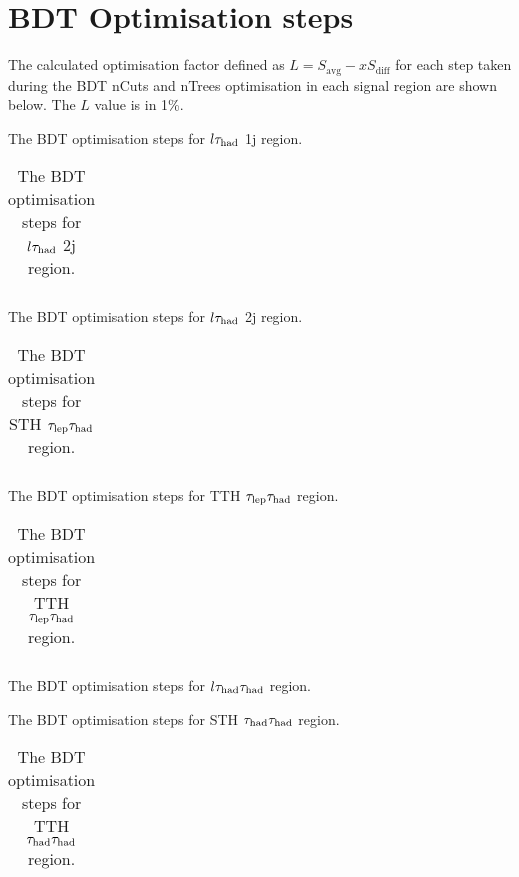 \section{BDT Optimisation steps}
\label{sec:BDTOptim}

The calculated optimisation factor defined as $L=S_\mathrm{avg}-xS_\mathrm{diff}$ for each step taken during the BDT nCuts and nTrees optimisation in each signal region are shown below. The $L$ value is in 1\%.

\begin{table}[H]
\caption{The BDT optimisation steps for $l\tau_\text{had}$ 1j region.}

\end{table}
\begin{longtable}{|c|c|c|c|c|c|}
\caption{The BDT optimisation steps for $l\tau_\text{had}$ 2j region.}\\\hline

\end{longtable}
\begin{table}[H]
\caption{The BDT optimisation steps for $l\tau_\text{had}$ 2j region.}

\end{table}
\begin{longtable}{|c|c|c|c|c|c|}
\caption{The BDT optimisation steps for STH $\tau_\text{lep}{}\tau_\text{had}$ region.}\\\hline

\end{longtable}
\begin{table}[H]
\caption{The BDT optimisation steps for TTH $\tau_\text{lep}{}\tau_\text{had}$ region.}

\end{table}
\begin{longtable}{|c|c|c|c|c|c|c|}
\caption{The BDT optimisation steps for TTH $\tau_\text{lep}{}\tau_\text{had}$ region.}\\\hline

\end{longtable}
\begin{table}[H]
\caption{The BDT optimisation steps for $l\tau_\text{had}{}\tau_\text{had}$ region.}

\end{table}
\begin{table}[H]
\caption{The BDT optimisation steps for STH $\tau_\text{had}{}\tau_\text{had}$ region.}

\end{table}
\begin{longtable}{|c|c|c|c|c|c|c|}
\caption{The BDT optimisation steps for TTH $\tau_\text{had}{}\tau_\text{had}$ region.}\\\hline

\end{longtable}